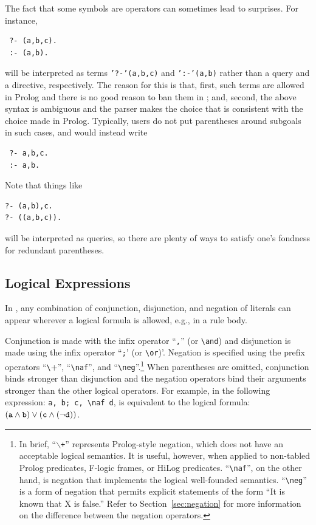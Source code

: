 \documentclass[11pt]{article}
\newcommand{\ERGO}{\mbox{\smaller{\ensuremath{\cal{E}}\smaller{{\sc{RGO}}}}}\xspace}
\newcommand{\FLSYSTEM}{\ERGO}
\newcommand{\bs}{\textbackslash}
\newcommand{\PLGNAF}{\mbox{\texttt{\bs}+}\xspace}
\newcommand{\RULELOGNAF}{{\texttt{{\bs}naf}}\xspace}
\newcommand{\RULELOGNEG}{{\texttt{{\bs}neg}}\xspace}
\begin{document}
The fact that some symbols are operators can sometimes lead to
surprises. For instance,
\begin{verbatim}
 ?- (a,b,c).
 :- (a,b).
\end{verbatim}
will be interpreted as terms {\tt '?-'(a,b,c)} and {\tt ':-'(a,b)} rather
than a query and a directive, respectively. The reason for this is that,
first, such terms are allowed in Prolog and there is no good reason to ban
them in \FLSYSTEM; and, second, the above syntax is ambiguous and the parser
makes the choice that is consistent with the choice made in
Prolog. Typically, users do not put parentheses around subgoals in such
cases, and would instead write
\begin{verbatim}
 ?- a,b,c.
 :- a,b.  
\end{verbatim}
Note that things like
\begin{verbatim}
?- (a,b),c.  
?- ((a,b,c)).
\end{verbatim}
will be interpreted as queries, so there are plenty of ways to satisfy
one's fondness for redundant parentheses.


\subsection{Logical Expressions}


%
In \FLSYSTEM, any combination of conjunction, disjunction, and
negation of literals can appear wherever a logical formula is allowed,
e.g., in a rule body.

Conjunction is made with the infix operator ``{\tt ,}'' (or
\texttt{\bs{}and})  and
disjunction is made using the infix operator ``{\tt ;}' (or
\texttt{\bs{}or})'.  Negation is
specified
using the prefix operators ``\PLGNAF'', ``\RULELOGNAF'', and ``\RULELOGNEG''.\footnote{
  In brief, ``{\tt $\backslash$+}'' represents Prolog-style negation, which
  does not have an acceptable logical semantics. It is useful, however,
  when applied
  to non-tabled Prolog predicates, F-logic frames, or HiLog
  predicates. ``\RULELOGNAF'', on the other hand, is negation that
  implements the logical well-founded semantics.
  ``\RULELOGNEG'' is a form of negation that permits explicit statements of
  the form ``It is known that X is false.''
  Refer to
  Section~\ref{sec:negation} for more information on the difference between
   the negation operators. 
  }
When parentheses are omitted, conjunction binds stronger than disjunction
and the negation operators bind their arguments stronger than the other
logical operators.  For example, in \FLSYSTEM the following expression:
{\tt a, b; c, \RULELOGNAF d}, is equivalent to the logical formula: $\tt (a
\wedge b) \vee (c \wedge (\neg d))$.
\end{document}
